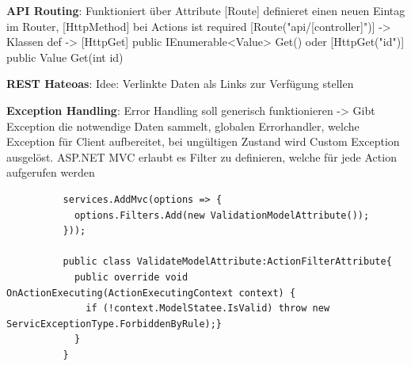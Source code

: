 \documentclass[10pt,landscape]{article}
\begin{document}
\begin{multicols}{2}
        \textbf{API Routing}: Funktioniert über Attribute [Route] definieret einen neuen Eintag im Router, [HttpMethod] bei Actions ist required
        [Route("api/[controller]")] -> Klassen def -> [HttpGet] public IEnumerable<Value> Get()  oder [HttpGet("{id}")] public Value Get(int id)


        \textbf{REST Hateoas}: Idee: Verlinkte Daten als Links zur Verfügung stellen 

        \textbf{Exception Handling}: Error Handling soll generisch funktionieren -> Gibt Exception die notwendige Daten sammelt, globalen Errorhandler, welche Exception für Client aufbereitet, bei ungültigen Zustand wird Custom Exception ausgelöst.
        ASP.NET MVC erlaubt es Filter zu definieren, welche für jede Action aufgerufen werden 
        \begin{lstlisting}
          services.AddMvc(options => {
            options.Filters.Add(new ValidationModelAttribute());
          }));

          public class ValidateModelAttribute:ActionFilterAttribute{
            public override void OnActionExecuting(ActionExecutingContext context) {
              if (!context.ModelStatee.IsValid) throw new ServicExceptionType.ForbiddenByRule);}
            }
          }
        \end{lstlisting}
        
      
    \end{multicols}
\end{document}
